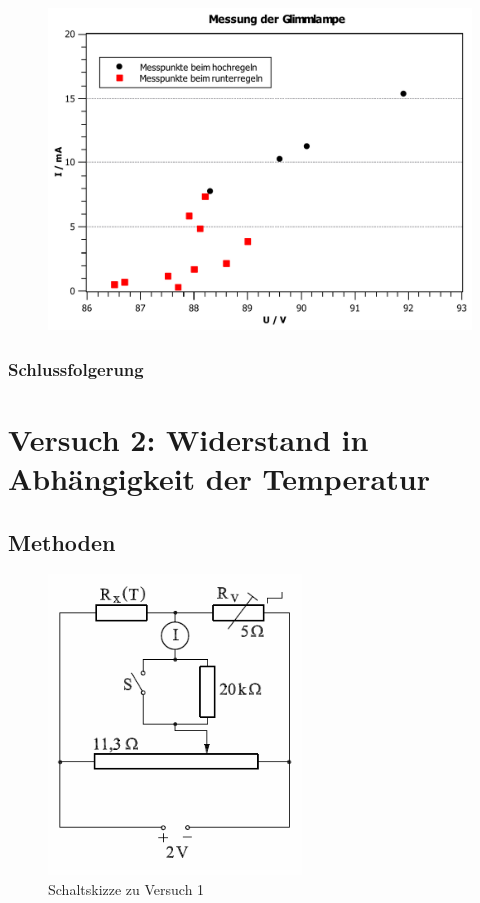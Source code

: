\documentclass[11pt,a4paper,titlepage, ngerman]{article}
\begin{document}
			
				\begin{figure}
					\centering
					\includegraphics[width=\textwidth]{KennlinieGlimmlampe.pdf}
					\caption{}
					\label{}
				\end{figure}
			
			\subsubsection{Schlussfolgerung}
			
			
	\section{Versuch 2: Widerstand in Abhängigkeit der Temperatur}		

		\subsection{Methoden} %
		
			
			\begin{figure}
				\centering
				\includegraphics[width=0.6\textwidth]{Versuch2.png}
				\caption{Schaltskizze zu Versuch 1}
				\label{Schaltskizze2}
			\end{figure}
		
\end{document}
